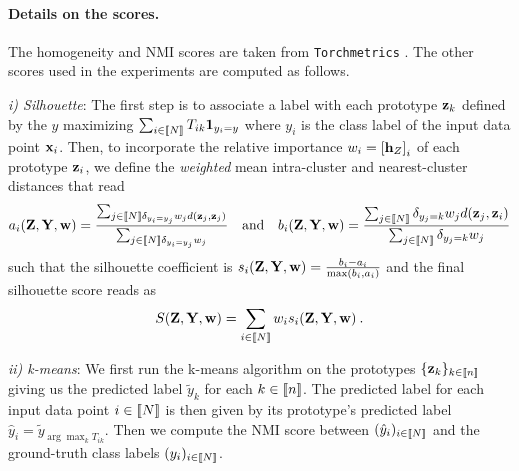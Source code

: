 \paragraph{Details on the scores.} The homogeneity and NMI scores are taken from \texttt{Torchmetrics} \citep{detlefsen2022torchmetrics}. The other scores used in the experiments are computed as follows.

\textit{i) Silhouette}: The first step is to associate a label with each prototype ${\mathbf{z}}_k$ defined by the $y$ maximizing $\sum_{i \in {[\![N]\!]}} T_{ik} \bm{1}_{y_i = y}$ where $y_i$ is the class label of the input data point ${\mathbf{x}}_i$. Then, to incorporate the relative importance $w_i = \left[{\mathbf{h}}_Z\right]_i$ of each prototype ${\mathbf{z}}_i$, we define the \emph{weighted} mean intra-cluster and nearest-cluster distances that read 
	\begin{equation}
		a_i (\mZ, \mY, \vw)= \frac{\sum_{j\in \integ{N} \delta_{y_i =y_j} w_j d(\vz_j, \vz_j)}}{\sum_{j \in \integ{N} \delta_{y_i = y_j} w_j }} \quad \text{and} \quad b_i (\mZ, \mY, \vw)= \frac{\sum_{j \in \integ{N}} \delta_{y_j = k} w_j d(\vz_j, \vz_i)}{ \sum_{j \in \integ{N}} \delta_{y_j = k}w_j }
	\end{equation}
	such that the silhouette coefficient is $s_i({\mathbf{Z}}, {\mathbf{Y}}, {\mathbf{w}}) = \frac{b_i - a_i}{\max(b_i, a_i)}$ and the final silhouette score reads as
	\begin{equation}
		S({\mathbf{Z}}, {\mathbf{Y}}, {\mathbf{w}}) = \sum_{i \in {[\![N]\!]}} w_i s_i({\mathbf{Z}}, {\mathbf{Y}}, {\mathbf{w}}) \:.
	\end{equation}

\textit{ii) k-means}: We first run the k-means algorithm on the prototypes $\{{\mathbf{z}}_k\}_{k \in {[\![n]\!]}}$ giving us the predicted label $\tilde{y}_k$ for each $k \in {[\![n]\!]}$. The predicted label for each input data point $i \in {[\![N]\!]}$ is then given by its prototype's predicted label \ie $\hat{y}_i = \tilde{y}_{\arg \max_k T_{ik}}$. Then we compute the NMI score \citep{kvaalseth2017normalized} between $(\hat{y}_i)_{i \in {[\![N]\!]}}$ and the ground-truth class labels $(y_i)_{i \in {[\![N]\!]}}$.


